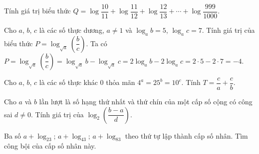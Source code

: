 \begin{vd}
	Tính giá trị biểu thức $Q=\log\dfrac{10}{11}+\log\dfrac{11}{12}+\log\dfrac{12}{13}+\cdots +\log\dfrac{999}{1000}$.	
\end{vd}
\begin{vd}
	Cho $a$, $b$, $c$ là các số thực dương, $a\neq 1$ và $\log_a b = 5$, $\log_a c = 7$. Tính giá trị của biểu thức $P = \log_{\sqrt{a}}\left(\dfrac{b}{c}\right)$.
	\loigiai
	{
		Ta có $P = \log_{\sqrt{a}}\left(\dfrac{b}{c}\right) = \log_{\sqrt{a}}b - \log_{\sqrt{a}}c = 2\log_ab - 2\log_ac = 2\cdot5 - 2\cdot7 = -4$.
	}
\end{vd}
\begin{vd}
	Cho $a$, $b$, $c$ là các số thực khác $0$ thỏa mãn $4^a=25^b=10^c$. Tính $T=\dfrac{c}{a}+\dfrac{c}{b}$.
\end{vd}
\begin{vd}
	Cho $a$ và $b$ lần lượt là số hạng thứ nhất và thứ chín của một cấp số cộng có công sai $d\ne 0$. Tính giá trị của $\log_2 \left(\dfrac{b-a}{d}\right)$.
\end{vd}
\begin{vd}
	Ba số $a+\log_23$; $a+\log_43$; $a+\log_83$ theo thứ tự lập thành cấp số nhân. Tìm công bội của cấp số nhân này.
\end{vd}

